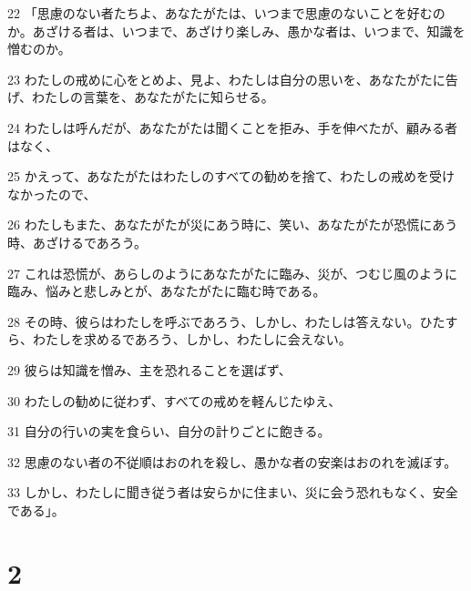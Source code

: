 \par 22 「思慮のない者たちよ、あなたがたは、いつまで思慮のないことを好むのか。あざける者は、いつまで、あざけり楽しみ、愚かな者は、いつまで、知識を憎むのか。
\par 23 わたしの戒めに心をとめよ、見よ、わたしは自分の思いを、あなたがたに告げ、わたしの言葉を、あなたがたに知らせる。
\par 24 わたしは呼んだが、あなたがたは聞くことを拒み、手を伸べたが、顧みる者はなく、
\par 25 かえって、あなたがたはわたしのすべての勧めを捨て、わたしの戒めを受けなかったので、
\par 26 わたしもまた、あなたがたが災にあう時に、笑い、あなたがたが恐慌にあう時、あざけるであろう。
\par 27 これは恐慌が、あらしのようにあなたがたに臨み、災が、つむじ風のように臨み、悩みと悲しみとが、あなたがたに臨む時である。
\par 28 その時、彼らはわたしを呼ぶであろう、しかし、わたしは答えない。ひたすら、わたしを求めるであろう、しかし、わたしに会えない。
\par 29 彼らは知識を憎み、主を恐れることを選ばず、
\par 30 わたしの勧めに従わず、すべての戒めを軽んじたゆえ、
\par 31 自分の行いの実を食らい、自分の計りごとに飽きる。
\par 32 思慮のない者の不従順はおのれを殺し、愚かな者の安楽はおのれを滅ぼす。
\par 33 しかし、わたしに聞き従う者は安らかに住まい、災に会う恐れもなく、安全である」。

\chapter{2}

